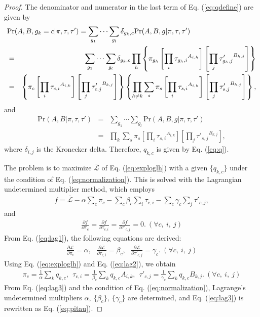 \documentclass[12pt]{article} %
\begin{document}
\begin{proof}
The denominator and numerator in the last term of Eq. (\ref{eq:qdefine}) are given by
\begin{eqnarray*}
  \lefteqn{ \mathrm{Pr}(A,B,g_k=c|\pi,\tau,\tau') = \sum_{g_1}\cdots \sum_{g_l} \delta_{g_k,c} \mathrm{Pr}(A,B,g|\pi,\tau,\tau') }\\
  &=& \sum_{g_1}\cdots \sum_{g_l} \delta_{g_k,c} \prod_h \left\{ \pi_{g_h} \left[ \prod_i {\tau_{g_h,i}}^{A_{i,h}} \right] \left[ \prod_j {\tau'_{g_h,j}}^{B_{h,j}} \right] \right\}\\
  &=& \left\{ \pi_c \left[ \prod_i {\tau_{c,i}}^{A_{i,k}} \right] \left[ \prod_j {\tau'_{c,j}}^{B_{k,j}} \right] \right\} \left\{ \prod_{h\neq k} \sum_s \pi_s \left[ \prod_i {\tau_{s,i}}^{A_{i,h}} \right] \left[ \prod_j {\tau'_{s,j}}^{B_{h,j}} \right] \right\},
\end{eqnarray*}
and
\begin{eqnarray*}
  \mathrm{Pr}(A,B|\pi,\tau,\tau') &=& \sum_{g_1}\cdots \sum_{g_l} \mathrm{Pr}(A,B,g|\pi,\tau,\tau')\\
  &=& \prod_k \sum_s \pi_s \left[ \prod_i {\tau_{s,i}}^{A_{i,k}} \right] \left[ \prod_j {\tau'_{s,j}}^{B_{k,j}} \right],
\end{eqnarray*}
where $\delta_{i,j}$ is the Kronecker delta. Therefore, $q_{k,c}$ is given by Eq. (\ref{eq:q}).

The problem is to maximize $\bar{\mathcal{L}}$ of Eq. (\ref{eq:exploglh}) with a given $\{q_{k,c}\}$ under the condition of Eq. (\ref{eq:normalization}). This is solved with the Lagrangian undetermined multiplier method, which employs
\begin{eqnarray*}
  f = \bar{\mathcal{L}}-\alpha \sum_c \pi_c-\sum_c \beta_c \sum_i \tau_{c,i}-\sum_c \gamma_c \sum_j \tau'_{c,j},
\end{eqnarray*}
and
\begin{eqnarray}
  \frac{\partial f}{\partial \pi_c}=\frac{\partial f}{\partial \tau_{c,i}}=\frac{\partial f}{\partial \tau'_{c,j}}=0.\ (\forall c,\ i,\ j)
  \label{eq:lag1}
\end{eqnarray}
From Eq. (\ref{eq:lag1}), the following equations are derived:
\begin{eqnarray}
\frac{\partial \bar{\mathcal{L}}}{\partial \pi_c}=\alpha,\ \ \ 
\frac{\partial \bar{\mathcal{L}}}{\partial \tau_{c,i}}=\beta_c,\ \ \ 
\frac{\partial \bar{\mathcal{L}}}{\partial \tau'_{c,j}}=\gamma_c.\ (\forall c,\ i,\ j)
  \label{eq:lag2}
\end{eqnarray}
Using Eq. (\ref{eq:exploglh}) and Eq. (\ref{eq:lag2}), we obtain 
\begin{eqnarray}
\pi_c = \frac{1}{\alpha}\sum_k q_{k,c},\ \ 
\tau_{c,i} = \frac{1}{\beta_c} \sum_k q_{k,c} A_{i,k},\ \ 
\tau'_{c,j} = \frac{1}{\gamma_c} \sum_k q_{k,c} B_{k,j}.\ (\forall c,\ i,\ j)
  \label{eq:lag3}
\end{eqnarray}
From Eq. (\ref{eq:lag3}) and the condition of Eq. (\ref{eq:normalization}), Lagrange's undetermined multipliers $\alpha,\ \{\beta_c\},\ \{\gamma_c\}$ are determined, and Eq. (\ref{eq:lag3}) is rewritten as Eq. (\ref{eq:pitau}). 
\end{proof}
\end{document}
